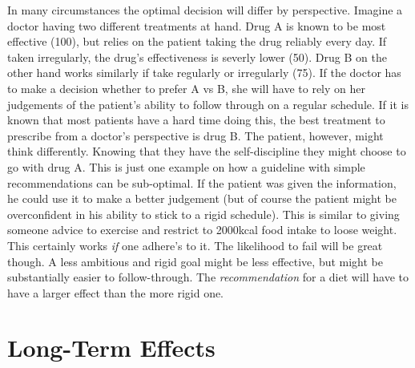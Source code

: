 \documentclass[
]{book}
\theoremstyle{definition}
\theoremstyle{definition}
\theoremstyle{definition}
\theoremstyle{remark}
\begin{document}
In many circumstances the optimal decision will differ by perspective. Imagine a doctor having two different treatments at hand. Drug A is known to be most effective (100), but relies on the patient taking the drug reliably every day. If taken irregularly, the drug's effectiveness is severly lower (50). Drug B on the other hand works similarly if take regularly or irregularly (75). If the doctor has to make a decision whether to prefer A vs B, she will have to rely on her judgements of the patient's ability to follow through on a regular schedule. If it is known that most patients have a hard time doing this, the best treatment to prescribe from a doctor's perspective is drug B. The patient, however, might think differently. Knowing that they have the self-discipline they might choose to go with drug A.
This is just one example on how a guideline with simple recommendations can be sub-optimal. If the patient was given the information, he could use it to make a better judgement (but of course the patient might be overconfident in his ability to stick to a rigid schedule).
This is similar to giving someone advice to exercise and restrict to 2000kcal food intake to loose weight. This certainly works \emph{if} one adhere's to it. The likelihood to fail will be great though. A less ambitious and rigid goal might be less effective, but might be substantially easier to follow-through. The \emph{recommendation} for a diet will have to have a larger effect than the more rigid one.

\hypertarget{long-term-effects}{%
\section{Long-Term Effects}\label{long-term-effects}}
\end{document}
